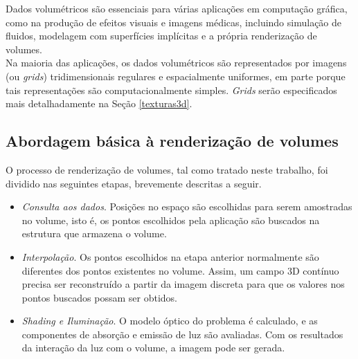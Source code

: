 
Dados volumétricos são essenciais para várias aplicações em computação gráfica, como na produção de efeitos visuais e imagens médicas, incluindo simulação de fluidos, modelagem com superfícies implícitas e a própria renderização de volumes. \\


Na maioria das aplicações, os dados volumétricos são representados por imagens (ou \emph{grids}) tridimensionais regulares e espacialmente uniformes, em parte porque tais representações são computacionalmente simples. \emph{Grids} serão especificados mais detalhadamente na Seção \ref{texturas3d}.

\subsection*{Abordagem básica à renderização de volumes}
\label{approach}

O processo de renderização de volumes, tal como tratado neste trabalho, foi dividido nas seguintes etapas, brevemente descritas a seguir. \\

\begin{itemize}
\item \emph{Consulta aos dados}. Posições no espaço são escolhidas para serem amostradas no volume, isto é, os pontos escolhidos pela aplicação são buscados na estrutura que armazena o volume. 

\item \emph{Interpolação}. Os pontos escolhidos na etapa anterior normalmente são diferentes dos pontos existentes no volume. Assim, um campo 3D contínuo precisa ser reconstruído a partir da imagem discreta para que os valores nos pontos buscados possam ser obtidos. 

\item \emph{Shading e Iluminação}. O modelo óptico do problema é calculado, e as componentes de absorção e emissão de luz são avaliadas. Com os resultados da interação da luz com o volume, a imagem pode ser gerada.
\end{itemize}

